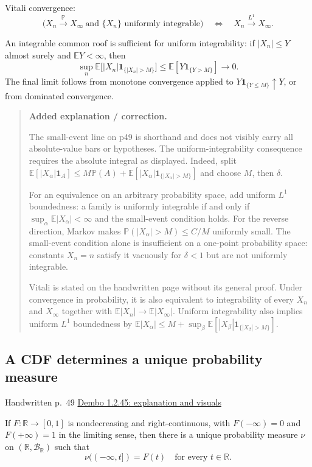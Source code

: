 \documentclass[11pt,letterpaper]{article}
\newcommand{\lecturesection}[1]{\subsection{#1}}
\begin{document}
Vitali convergence: \[\bigl(X_n\xrightarrow{\mathbb P}X_\infty\ \text{and }\{X_n\}\text{ uniformly integrable}\bigr)\quad\Longleftrightarrow\quad X_n\xrightarrow{L^1}X_\infty.\]

An integrable common roof is sufficient for uniform integrability: if $|X_n|\le Y$ almost surely and $\mathbb E Y<\infty$, then \[\sup_n\mathbb E\bigl[|X_n|\mathbf1_{\{|X_n|>M\}}\bigr]\le\mathbb E[Y\mathbf1_{\{Y>M\}}]\longrightarrow0.\] The final limit follows from monotone convergence applied to $Y\mathbf1_{\{Y\le M\}}\uparrow Y$, or from dominated convergence.

\begin{quote}\small\textbf{Added explanation / correction.}

The small-event line on p49 is shorthand and does not visibly carry all absolute-value bars or hypotheses. The uniform-integrability consequence requires the absolute integral as displayed. Indeed, split $\mathbb E[|X_\alpha|\mathbf1_A]\le M\mathbb P(A)+\mathbb E[|X_\alpha|\mathbf1_{\{|X_\alpha|>M\}}]$ and choose $M$, then $\delta$.

For an equivalence on an arbitrary probability space, add uniform $L^1$ boundedness: a family is uniformly integrable if and only if $\sup_\alpha\mathbb E|X_\alpha|<\infty$ and the small-event condition holds. For the reverse direction, Markov makes $\mathbb P(|X_\alpha|>M)\le C/M$ uniformly small. The small-event condition alone is insufficient on a one-point probability space: constants $X_n=n$ satisfy it vacuously for $\delta<1$ but are not uniformly integrable.

Vitali is stated on the handwritten page without its general proof. Under convergence in probability, it is also equivalent to integrability of every $X_n$ and $X_\infty$ together with $\mathbb E|X_n|\to\mathbb E|X_\infty|$. Uniform integrability also implies uniform $L^1$ boundedness by $\mathbb E|X_\alpha|\le M+\sup_\beta\mathbb E[|X_\beta|\mathbf1_{\{|X_\beta|>M\}}]$.
\end{quote}

\hypertarget{l6-s5}{}
\lecturesection{A CDF determines a unique probability measure}
{\small\textcolor{lectureink}{Handwritten p.\ 49} \quad \href{https://josephrbailey.com/probability/\#entry-1-2-45}{Dembo 1.2.45: explanation and visuals}}

If $F:\mathbb R\to[0,1]$ is nondecreasing and right-continuous, with $F(-\infty)=0$ and $F(+\infty)=1$ in the limiting sense, then there is a unique probability measure $\nu$ on $(\mathbb R,\mathcal B_{\mathbb R})$ such that \[\nu(( -\infty,t])=F(t)\quad\text{for every }t\in\mathbb R.\]
\end{document}
